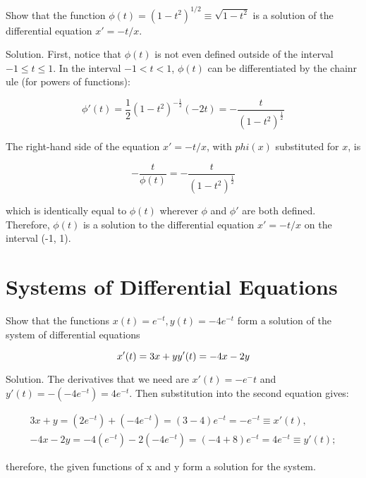     \begin{problem}
      Show that the function $\phi(t)=(1-t^2)^{1/2}\equiv\sqrt{1-t^2}$ is a solution of the differential equation $x'=-t/x$.

      Solution. First, notice that $\phi(t)$ is not even defined outside of the interval $-1\le t\le 1$. In the interval $-1<t<1$, $\phi(t)$ can be differentiated by the chainr ule (for powers of functions):

      \begin{equation}
        \phi'(t) =\frac{1}{2}(1 - t^2)^{ - \frac{1}{2}}( - 2t) =- \frac{t}{(1 - t^2)^{\frac{1}{2}}}
      \end{equation}

      The right-hand side of the equation $x'=-t/x$, with $phi(x)$ substituted for $x$, is 

      \begin{equation}
        - \frac{t}{\phi (t)} =- \frac{t}{(1 - t^2)^{\frac{1}{2}}}
      \end{equation}

      which is identically equal to $\phi(t)$ wherever $\phi$ and $\phi'$ are both defined. Therefore, $\phi(t)$ is a solution to the differential equation $x'=-t/x$ on the interval (-1, 1).
    \end{problem}

\section{Systems of Differential Equations}

  \begin{problem}
    Show that the functions $x(t)=e^{-t},y(t)=-4e^{-t}$ form a solution of the system of differential equations

    \begin{equation}
      x'(t) = 3x + y\newline
      y'(t) =- 4x - 2y
    \end{equation}

    Solution. The derivatives that we need are $x'(t)=-e^-t$ and $y'(t)=-(-4e^{-t})=4e^{-t}$. Then substitution into the second equation gives:

    \begin{align}
      3x+y=(2e^{-t})+(-4e^{-t})=(3-4)e^{-t}=-e^{-t}\equiv x'(t),\\
      -4x-2y=-4(e^{-t})-2(-4e^{-t})=(-4+8)e^{-t}=4e^{-t}\equiv y'(t);
    \end{align}

    therefore, the given functions of x and y form a solution for the system.
  \end{problem}

